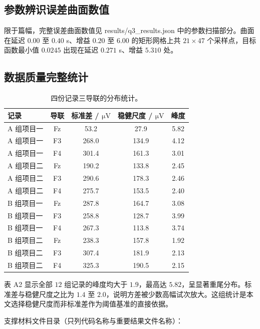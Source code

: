\documentclass[bwprint]{gmcmthesis}
\begin{document}
\begin{appendices}
\subsection{参数辨识误差曲面数值}

限于篇幅，完整误差曲面数值见 results/q3\_results.json 中的参数扫描部分。曲面在延迟 $0.00$ 至 $0.40$ s、增益 $0.20$ 至 $6.00$ 的矩形网格上共 $21 \times 47$ 个采样点，目标函数最小值 $0.0245$ 出现在延迟 $0.271$ s、增益 $5.310$ 处。

\subsection{数据质量完整统计}

\begin{table}[htp!]
\centering
\renewcommand\arraystretch{1.2}
\caption{四份记录三导联的分布统计。}
\begin{tabular}{|l|c|c|c|c|}
  \hline
  记录 & 导联 & 标准差 / $\si{\micro\volt}$ & 稳健尺度 / $\si{\micro\volt}$ & 峰度 \\
  \hline
  A 组项目一 & Fz & 53.2 & 27.9 & 5.82 \\
  \hline
  A 组项目一 & F3 & 268.0 & 134.9 & 4.12 \\
  \hline
  A 组项目一 & F4 & 301.4 & 161.3 & 3.01 \\
  \hline
  A 组项目二 & Fz & 190.2 & 133.8 & 2.45 \\
  \hline
  A 组项目二 & F3 & 290.6 & 178.3 & 2.46 \\
  \hline
  A 组项目二 & F4 & 275.7 & 153.5 & 2.40 \\
  \hline
  B 组项目一 & Fz & 287.8 & 164.7 & 3.08 \\
  \hline
  B 组项目一 & F3 & 258.8 & 128.7 & 3.99 \\
  \hline
  B 组项目一 & F4 & 267.3 & 113.8 & 3.74 \\
  \hline
  B 组项目二 & Fz & 238.3 & 157.8 & 1.92 \\
  \hline
  B 组项目二 & F3 & 307.4 & 181.9 & 2.13 \\
  \hline
  B 组项目二 & F4 & 325.3 & 190.5 & 2.15 \\
  \hline
\end{tabular}
\end{table}

表 A2 显示全部 $12$ 组记录的峰度均大于 $1.9$，最高达 $5.82$，呈显著重尾分布。标准差与稳健尺度之比为 $1.4$ 至 $2.0$，说明方差被少数高幅试次放大。这组统计是本文选择稳健尺度而非标准差作为阈值基准的直接依据。

\par\noindent\hspace{2em}支撑材料文件目录（只列代码名称与重要结果文件名称）：\par


\end{appendices}
\end{document}
